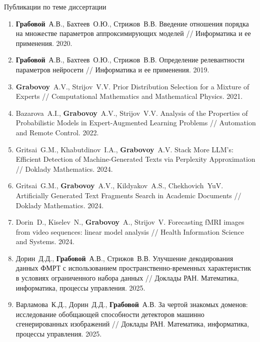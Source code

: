 \documentclass[10pt,pdf,hyperref={unicode}]{beamer}
\begin{document}
\begin{frame}{Публикации по теме диссертации}
\begin{enumerate}
    \item \textbf{Грабовой}~А.\;В., Бахтеев~О.\;Ю., Стрижов~В.\;В. Введение отношения порядка на множестве параметров аппроксимирующих моделей // Информатика и ее применения. 2020.
    \item \textbf{Грабовой}~А.\;В., Бахтеев~О.\;Ю., Стрижов~В.\;В. Определение релевантности параметров нейросети // Информатика и ее применения. 2019.
    \item \textbf{Grabovoy}~A.\;V., Strijov~V.\;V. Prior Distribution Selection for a Mixture of Experts // Computational Mathematics and Mathematical Physics. 2021.
    \item Bazarova~A.\;I., \textbf{Grabovoy}~A.\;V., Strijov~V.\;V. Analysis of the Properties of Probabilistic Models in Expert-Augmented Learning Problems // Automation and Remote Control. 2022.
    \item Gritsai~G.\;M., Khabutdinov~I.\;A., \textbf{Grabovoy}~A.\;V. Stack More LLM's: Efficient Detection of Machine-Generated Texts via Perplexity Approximation // Doklady Mathematics. 2024.
    \item Gritsai~G.\;M., \textbf{Grabovoy}~A.\;V., Kildyakov~A.\;S., Chekhovich~Yu\;V. Artificially Generated Text Fragments Search in Academic Documents // Doklady Mathematics. 2024.
    \item Dorin~D., Kiselev~N., \textbf{Grabovoy}~A., Strijov~V. Forecasting fMRI images from video sequences: linear model analysis // Health Information Science and Systems. 2024.
    \item Дорин~Д.\;Д., \textbf{Грабовой}~А.\;В., Стрижов~В.\;В. Улучшение декодирования данных ФМРТ с использованием пространственно-временных характеристик в условиях ограниченного набора данных // Доклады РАН. Математика, информатика, процессы управления. 2025.
    \item Варламова~К.\;Д., Дорин~Д.\;Д., \textbf{Грабовой}~А.\;В. За чертой знакомых доменов: исследование обобщающей способности детекторов машинно сгенерированных изображений // Доклады РАН. Математика, информатика, процессы управления. 2025.
\end{enumerate}
\end{frame}
\end{document}
